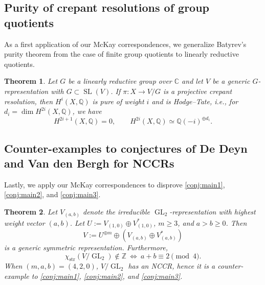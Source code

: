 \documentclass[12pt,a4paper]{amsart}
\newtheorem{theorem}{Theorem}
\theoremstyle{definition}
\newcommand{\ZZ}{\mathbb{Z}}
\newcommand{\QQ}{\mathbb{Q}}
\newcommand{\CC}{\mathbb{C}}
\newcommand{\str}{\mathrm{str}}
\renewcommand{\1}{\textbf{1}}
\newcommand{\<}{\langle}
\renewcommand{\>}{\rangle}
\DeclareMathOperator{\GL}{GL}
\DeclareMathOperator{\SL}{SL}
\begin{document}
\subsection{Purity of crepant resolutions of group quotients}

As a first application of our McKay correspondences, we generalize Batyrev's purity theorem \cite[Theorem 8.4]{Batyrev99} from the case of finite group quotients to linearly reductive quotients.



\begin{theorem}\label{thm:purity-Hodge-Tate}
Let $G$ be a linearly reductive group over $\CC$ and let $V$ be a generic $G$-representation with $G\subset\SL(V)$. If $\pi\colon X\to V/G$ is a projective crepant resolution, then $H^i(X,\QQ)$ is pure of weight $i$ and is Hodge--Tate, i.e., for $d_i = \dim H^{2i}(X,\QQ)$, we have
\[
 H^{2i+1}(X,\QQ)=0,\qquad H^{2i}(X,\QQ)\simeq\QQ(-i)^{\oplus d_i}.
\]
\end{theorem}





\subsection{Counter-examples to conjectures of De Deyn and Van den Bergh for NCCRs}

Lastly, we apply our McKay correspondences to disprove \autoref{conj:main1}, \autoref{conj:main2}, and \autoref{conj:main3}.



\begin{theorem}\label{thm:NCCR-counter-examples}
Let $V_{(a,b)}$ denote the irreducible $\GL_2$-representation with highest weight vector $(a,b)$. Let $U:=V_{(1,0)}\oplus V_{(1,0)}^*$, $m\geq3$, and $a>b\geq0$. Then
\[
	V:=U^{\oplus m}\oplus (V_{(a,b)}\oplus V_{(a,b)}^*)
\]
is a generic symmetric representation. Furthermore, 
\[
	\chi_{\str}(V/\GL_2)\notin\ZZ\ \Longleftrightarrow\ a+b\equiv2\pmod{4}.
\]
When $(m,a,b)=(4,2,0)$, $V/\GL_2$ has an NCCR, hence it is a counter-example to \autoref{conj:main1}, \autoref{conj:main2}, and \autoref{conj:main3}.
\end{theorem}
\end{document}
